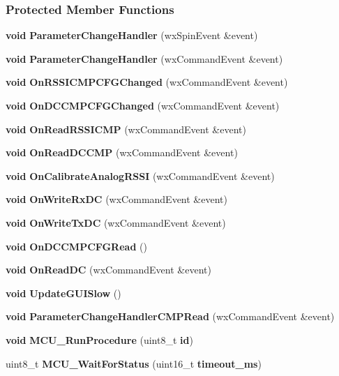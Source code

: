 \subsubsection*{Protected Member Functions}
\begin{DoxyCompactItemize}
\item 
{\bf void} {\bf Parameter\+Change\+Handler} (wx\+Spin\+Event \&event)
\item 
{\bf void} {\bf Parameter\+Change\+Handler} (wx\+Command\+Event \&event)
\item 
{\bf void} {\bf On\+R\+S\+S\+I\+C\+M\+P\+C\+F\+G\+Changed} (wx\+Command\+Event \&event)
\item 
{\bf void} {\bf On\+D\+C\+C\+M\+P\+C\+F\+G\+Changed} (wx\+Command\+Event \&event)
\item 
{\bf void} {\bf On\+Read\+R\+S\+S\+I\+C\+MP} (wx\+Command\+Event \&event)
\item 
{\bf void} {\bf On\+Read\+D\+C\+C\+MP} (wx\+Command\+Event \&event)
\item 
{\bf void} {\bf On\+Calibrate\+Analog\+R\+S\+SI} (wx\+Command\+Event \&event)
\item 
{\bf void} {\bf On\+Write\+Rx\+DC} (wx\+Command\+Event \&event)
\item 
{\bf void} {\bf On\+Write\+Tx\+DC} (wx\+Command\+Event \&event)
\item 
{\bf void} {\bf On\+D\+C\+C\+M\+P\+C\+F\+G\+Read} ()
\item 
{\bf void} {\bf On\+Read\+DC} (wx\+Command\+Event \&event)
\item 
{\bf void} {\bf Update\+G\+U\+I\+Slow} ()
\item 
{\bf void} {\bf Parameter\+Change\+Handler\+C\+M\+P\+Read} (wx\+Command\+Event \&event)
\item 
{\bf void} {\bf M\+C\+U\+\_\+\+Run\+Procedure} (uint8\+\_\+t {\bf id})
\item 
uint8\+\_\+t {\bf M\+C\+U\+\_\+\+Wait\+For\+Status} (uint16\+\_\+t {\bf timeout\+\_\+ms})
\end{DoxyCompactItemize}
